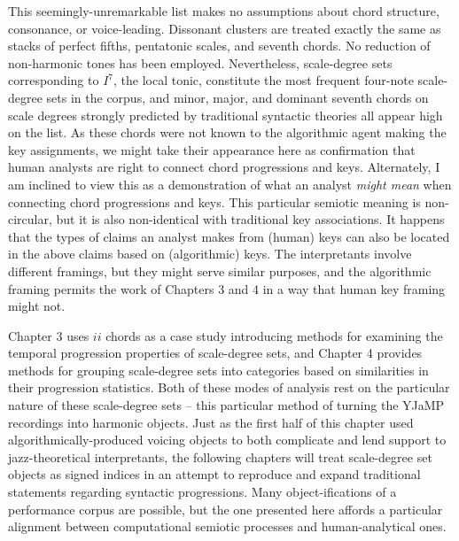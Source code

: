 This seemingly-unremarkable list makes no assumptions about chord structure, consonance, or voice-leading.  Dissonant clusters are treated exactly the same as stacks of perfect fifths, pentatonic scales, and seventh chords.  No reduction of non-harmonic tones has been employed.  Nevertheless, scale-degree sets corresponding to $I^7$, the local tonic, constitute the most frequent four-note scale-degree sets in the corpus, and minor, major, and dominant seventh chords on scale degrees strongly predicted by traditional syntactic theories all appear high on the list.  As these chords were not known to the algorithmic agent making the key assignments, we might take their appearance here as confirmation that human analysts are right to connect chord progressions and keys.  Alternately, I am inclined to view this as a demonstration of what an analyst \emph{might mean} when connecting chord progressions and keys.  This particular semiotic meaning is non-circular, but it is also non-identical with traditional key associations.  It happens that the types of claims an analyst makes from (human) keys can also be located in the above claims based on (algorithmic) keys.  The interpretants involve different framings, but they might serve similar purposes, and the algorithmic framing permits the work of Chapters 3 and 4 in a way that human key framing might not.

Chapter 3 uses $ii$ chords as a case study introducing methods for examining the temporal progression properties of scale-degree sets, and Chapter 4 provides methods for grouping scale-degree sets into categories based on similarities in their progression statistics.  Both of these modes of analysis rest on the particular nature of these scale-degree sets -- this particular method of turning the YJaMP recordings into harmonic objects.  Just as the first half of this chapter used algorithmically-produced voicing objects to both complicate and lend support to jazz-theoretical interpretants, the following chapters will treat scale-degree set objects as signed indices in an attempt to reproduce and expand traditional statements regarding syntactic progressions.  Many object-ifications of a performance corpus are possible, but the one presented here affords a particular alignment between computational semiotic processes and human-analytical ones.
	
